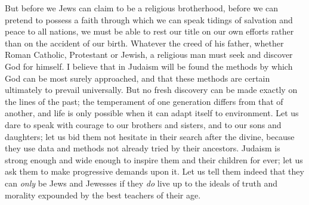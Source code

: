 But before we Jews can claim to be a religious brotherhood, before we can pretend to possess a faith through 
which we can speak tidings of salvation and peace to all 
nations, we must be able to rest our title on our own 
efforts rather than on the accident of our birth. Whatever 
the creed of his father, whether Roman Catholic, Protestant 
or Jewish, a religious man must seek and discover God for 
himself. I believe that in Judaism will be found the 
methods by which God can be most surely approached, and 
that these methods are certain ultimately to prevail universally. But no fresh discovery can be made exactly on 
the lines of the past; the temperament of one generation 
differs from that of another, and life is only possible when 
it can adapt itself to environment. Let us dare to speak 
with courage to our brothers and sisters, and to our sons 
and daughters; let us bid them not hesitate in their search 
after the divine, because they use data and methods not 
already tried by their ancestors. Judaism is strong enough 
and wide enough to inspire them and their children for 
ever; let us ask them to make progressive demands upon 
it. Let us tell them indeed that they can \textsl{only} be Jews 
and Jewesses if they \textsl{do} live up to the ideals of truth and 
morality expounded by the best teachers of their age. 

